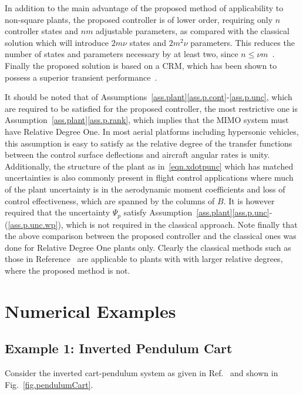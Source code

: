 In addition to the main advantage of the proposed method of applicability to non-square plants, the proposed controller is of lower order, requiring only $n$ controller states and $nm$ adjustable parameters, as compared with the classical solution which will introduce $2m\nu$ states and $2m^{2}\nu$ parameters.
This reduces the number of states and parameters necessary by at least two, since $n\leq\nu m$\ \cite{chen.linear.1999}.
Finally the proposed solution is based on a CRM, which has been shown to possess a superior transient performance\ \cite{gibson.aiaacrm.2012,gibson.acc.2013,gibson.ecc.2013,gibson.ieeeaccess.2013}.

It should be noted that of Assumptions~\ref{ass.plant}\ref{ass.p.cont}-\ref{ass.p.unc}, which are required to be satisfied for the proposed controller, the most restrictive one is Assumption~\ref{ass.plant}\ref{ass.p.rank}, which implies that the MIMO system must have Relative Degree One.
In most aerial platforms including hypersonic vehicles, this assumption is easy to satisfy as the relative degree of the transfer functions between the control surface deflections and aircraft angular rates is unity.
Additionally, the structure of the plant as in\ \eqref{eqn.xdotpunc} which has matched uncertainties is also commonly present in flight control applications where much of the plant uncertainty is in the aerodynamic moment coefficients and loss of control effectiveness, which are spanned by the columns of $B$.
It is however required that the uncertainty $\Psi_{p}$ satisfy Assumption~\ref{ass.plant}\ref{ass.p.unc}-(\ref{ass.p.unc.wp}), which is not required in the classical approach.
Note finally that the above comparison between the proposed controller and the classical ones was done for Relative Degree One plants only.
Clearly the classical methods such as those in Reference\ \cite{narendra.stable.2005} are applicable to plants with with larger relative degrees, where the proposed method is not.

\section{Numerical Examples}\label{sec.innerLoopNumericalExample}

\subsection{Example 1: Inverted Pendulum Cart}

Consider the inverted cart-pendulum system as given in Ref.\ \cite{astrom.feedbackintro.2010} and shown in Fig.~\ref{fig.pendulumCart}.

